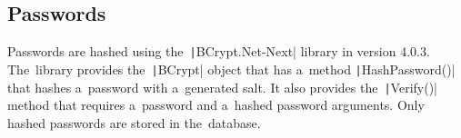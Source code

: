 \subsection{Passwords}

Passwords are hashed using the~\texttt|BCrypt.Net-Next| library in version 4.0.3.
The~library provides the~\texttt|BCrypt| object that has a~method \texttt|HashPassword()| that hashes a~password with a~generated salt.
It also provides the~\texttt|Verify()| method that requires a~password and a~hashed password arguments. 
Only hashed passwords are stored in the~database.
